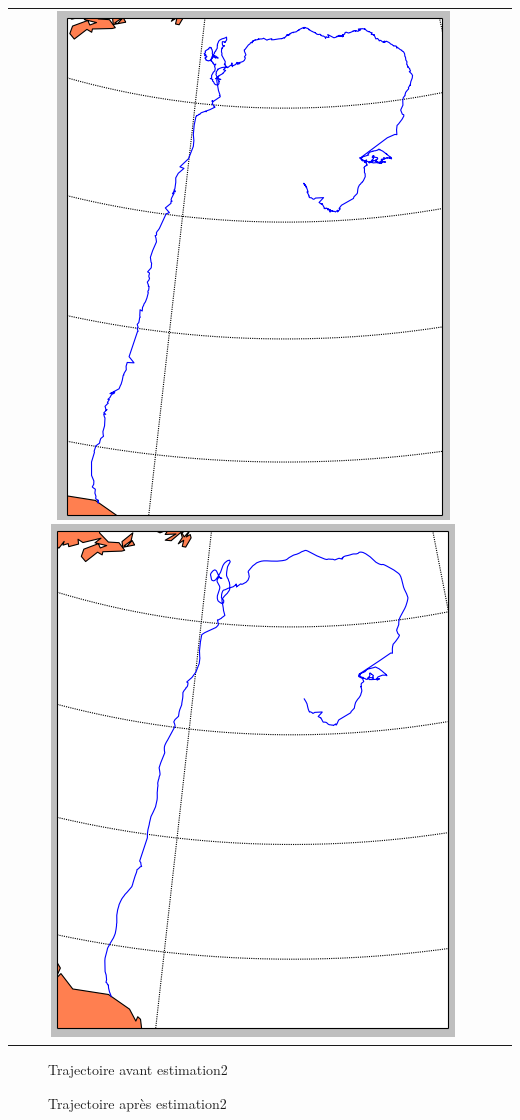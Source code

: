 \documentclass[11p, a4papert]{article}
\begin{document}
\begin{tabular}{cc}
   \includegraphics[scale=0.45]{SansEst2.png}
   \hspace{2cm}
   \includegraphics[scale=0.45]{AvecEst2.png}
\end{tabular}
\begin{figure}[h!]
 \begin{minipage}[b]{.46\linewidth}

  \caption{Trajectoire avant estimation2 \label{fig1}}
 \end{minipage} \hfill
 \begin{minipage}[b]{.46\linewidth}
  
  \caption{Trajectoire après estimation2 \label{fig2}}
 \end{minipage}
\end{figure}
\end{document}
